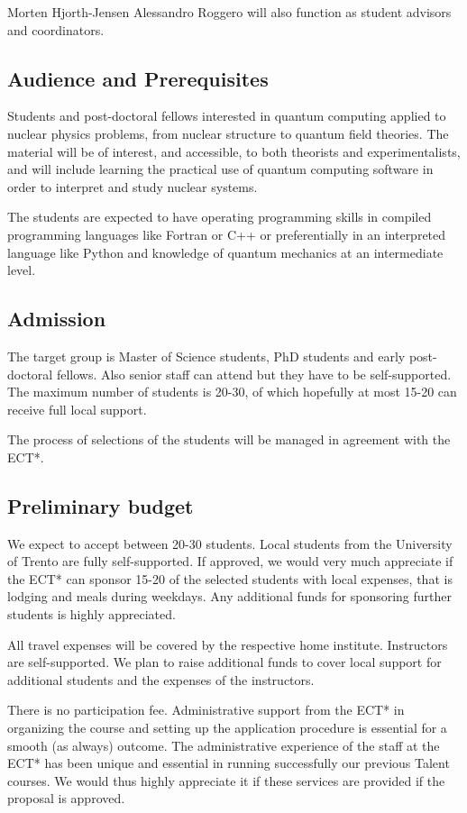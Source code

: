 \documentclass[superscriptaddress,amsmath,amssymb,aps,floatfix]{revtex4-2}
\begin{document}
Morten Hjorth-Jensen Alessandro Roggero will also function as student
advisors and coordinators.

\subsection{Audience and Prerequisites}

Students and post-doctoral fellows interested in quantum computing
applied to nuclear physics problems, from nuclear structure to quantum
field theories. The material will be of interest, and accessible, to
both theorists and experimentalists, and will include learning the
practical use of quantum computing software in order to interpret and
study nuclear systems.

The students are expected to have operating programming skills in
compiled programming languages like Fortran or C++ or preferentially in
an interpreted language like Python and knowledge of quantum mechanics
at an intermediate level.

\subsection{Admission}

The target group is Master of Science students, PhD students and early
post-doctoral fellows. Also senior staff can attend but they have to be
self-supported. The maximum number of students is 20-30, of which
hopefully at most 15-20 can receive full local support.

The process of selections of the students will be managed in agreement
with the ECT*.

\subsection{Preliminary budget}

We expect to accept between 20-30 students. Local students from the
University of Trento are fully self-supported. If approved, we would
very much appreciate if the ECT* can sponsor 15-20 of the selected
students with local expenses, that is lodging and meals during weekdays.
Any additional funds for sponsoring further students is highly
appreciated.

All travel expenses will be covered by the respective home institute.
Instructors are self-supported. We plan to raise additional funds to
cover local support for additional students and the expenses of the
instructors.

There is no participation fee. Administrative support from the ECT* in
organizing the course and setting up the application procedure is
essential for a smooth (as always) outcome. The administrative
experience of the staff at the ECT* has been unique and essential in
running successfully our previous Talent courses. We would thus highly
appreciate it if these services are provided if the proposal is
approved.
\end{document}
